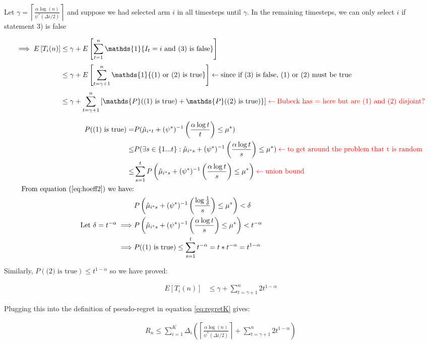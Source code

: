 \documentclass{article}
\newcommand{\ceil}[1]{\left \lceil {#1} \right\rceil}
\newcommand{\eqn}[1]{\begin{align}#1\end{align}}
\newcommand{\eq}[1]{\begin{align*}#1\end{align*}}
\theoremstyle{plain}
\theoremstyle{definition}
\begin{document}
Let $\gamma = \ceil{\frac{\alpha \log(n)}{\psi^*(\Delta i/2)}}$ and suppose we had selected arm $i$ in all timesteps until $\gamma$. In the remaining timesteps, we can only select $i$ if statement 3) is false 

\eq{
\implies E\left[T_{i}(n)\right] & \leq \gamma + E\left[\sum_{t=1}^{n} \mathds{1} \{I_t = i \text{ and (3) is false} \}\right] \\[3pt]
& \leq \gamma + E\left[\sum_{t=\gamma+1}^{n} \mathds{1} \{\text{(1) or (2) is true} \}\right] \leftarrow \text{since if (3) is false, (1) or (2) must be true}\\[3pt]
& \leq \gamma + \sum_{t=\gamma+1}^{n} \left[ \mathds{P}(\text{(1) is true}) + \mathds{P}(\text{(2) is true})  \}\right] \color{red} \leftarrow \text{Bubeck has $=$ here but are (1) and (2) disjoint?} 
}

\eq {
P(\text{(1) is true})  = & P(\hat{\mu}_{i^*t}+ (\psi^*)^{-1}\left( \frac{\alpha \log{t}}{t} \right) \leq \mu^*)\\
\leq & P(\exists s \in \{1...t\} : \hat{\mu}_{i^*s}+ (\psi^*)^{-1}\left( \frac{\alpha \log{t}}{s} \right) \leq \mu^*) \color{red} \leftarrow \text {to get around the problem that t is random}\\
\leq & \sum_{s=1}^t P\left( \hat{\mu}_{i^*s}+ (\psi^*)^{-1}\left( \frac{\alpha \log{t}}{s} \right) \leq \mu^* \right) \color{red} \leftarrow \text{union bound}\\
\text{ From equation (\ref{eq:hoeff2}) we have:}\\
& P\left( \hat{\mu}_{i^*s}+ (\psi^*)^{-1}\left( \frac{ \log{\frac{1}{\delta}}}{s} \right) \leq \mu^* \right) < \delta\\
\text{Let } \delta = t^{-\alpha} \implies & P\left( \hat{\mu}_{i^*s}+ (\psi^*)^{-1}\left( \frac{\alpha \log{t}}{s} \right)\leq \mu^* \right) < t^{-\alpha}\\
\implies & P(\text{(1) is true}) \leq \sum_{s=1}^t t^{-\alpha} = t*t^{-\alpha} =  t^{1-\alpha}
}

Similarly, $P(\text{(2) is true}) \leq t^{1-\alpha}$ so we have proved: 

\eqn {
 E\left[T_{i}(n)\right] & \leq \gamma + \sum_{t=\gamma+1}^n 2t^{1-\alpha}
}

Plugging this into the definition of pseudo-regret in equation \ref{eq:regretK} gives:


\eqn {
R_n \leq \sum_{i=1}^K \Delta_i  \left( \ceil{\frac{\alpha \log(n)}{\psi^*(\Delta i/2)}} + \sum_{t=\gamma+1}^n 2t^{1-\alpha}\right) 
}
\end{document}
